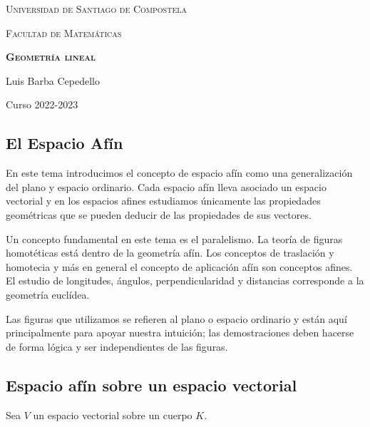 \documentclass[12pt, a4paper, ones, notitlepage, openany,titlepage]{article}
\date{Curso 2022-2023}
\author{}
\begin{document}
	
	\begin{titlepage}
		
		\centering
		{\scshape\LARGE Universidad de Santiago de Compostela \par}
		\vspace{1cm}
		{\scshape\Large Facultad de Matemáticas \par}
		\vspace{5cm}
		{\bfseries\scshape\Huge Geometría lineal\par}
		\vspace{12cm}
		
		{\Large Luis Barba Cepedello \par}
		\vfill
		{\Large Curso 2022-2023 \par}
	\end{titlepage}
	
	\setlength{\parskip}{0.30cm}
	
	\begin{center}
		\section{El Espacio Afín}
	\end{center}

En este tema introducimos el concepto de espacio afín como una generalización del plano y espacio ordinario. Cada espacio afín lleva asociado un espacio vectorial y en los espacios afines estudiamos únicamente las propiedades geométricas que se pueden deducir de las propiedades de sus vectores.

Un concepto fundamental en este tema es el paralelismo. La teoría de figuras homotéticas está dentro de la geometría afín. Los conceptos de traslación y homotecia y más en general el concepto de aplicación afín son conceptos afines. El estudio de longitudes, ángulos, perpendicularidad y distancias corresponde a la geometría euclídea.

Las figuras que utilizamos se refieren al plano o espacio ordinario y están aquí principalmente para apoyar nuestra intuición; las demostraciones deben hacerse de forma lógica y ser independientes de las figuras.

\subsection{Espacio afín sobre un espacio vectorial}
Sea $V$ un espacio vectorial sobre un cuerpo $K$.
\end{document}
